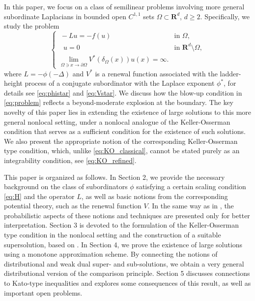 \documentclass[a4paper,12pt,draft]{article}
\theoremstyle{plain}
\theoremstyle{definition}
\numberwithin{equation}{section}
\renewcommand{\geq}{\geqslant}
\newcommand{\1}{1}
\begin{document}
In this paper, we focus on a class of semilinear problems involving more general subordinate Laplacians in bounded open \(C^{1,1}\) sets \(\Omega \subset \mathbf{R}^d\), \(d \geq 2\). Specifically, we study the problem
\begin{equation}\label{eq:problem}
\begin{cases}
\ -Lu = -f(u) & \text{in } \Omega, \\
\ \ \ u = 0 & \text{in } \mathbf{R}^d \setminus \Omega, \\
\lim\limits_{\Omega\ni x\to \partial \Omega}V^*(\delta_\Omega(x))u(x)=\infty.  & 
\end{cases}    
\end{equation}
where $L=-\phi(-\Delta)$ and \(V^*\) is a renewal function associated with the ladder-height process of a conjugate subordinator with the Laplace exponent $\phi^*$, for details see \eqref{eq:phistar} and \eqref{eq:Vstar}. We discuss how the blow-up condition in \eqref{eq:problem} reflects a beyond-moderate explosion at the boundary. The key novelty of this paper lies in extending the existence of large solutions to this more general nonlocal setting, under a nonlocal analogue of the Keller-Osserman condition that serves as a sufficient condition for the existence of such solutions. We also present the appropriate notion of the corresponding Keller-Osserman type condition, which, unlike \eqref{eq:KO_classical}, cannot be stated purely as an integrability condition, see \eqref{eq:KO_refined}. 

This paper is organized as follows. In Section 2, we provide the necessary background on the class of subordinators $\phi$ satisfying a certain scaling condition \eqref{eq:H} and the operator $L$, as well as basic notions from the corresponding potential theory, such as the renewal function $V$. In the same way as in \cite{benchrouda}, the probabilistic aspects of these notions and techniques are presented only for better interpretation. Section 3 is devoted to the formulation of the Keller-Osserman type condition in the nonlocal setting and the construction of a suitable supersolution, based on \cite{abatangelo2}. In Section 4, we prove the existence of large solutions using a monotone approximation scheme. By connecting the notions of distributional and weak dual super- and sub-solutions, we obtain a very general distributional version of the comparison principle. Section 5 discusses connections to Kato-type inequalities and explores some consequences of this result, as well as important open problems.
\end{document}
